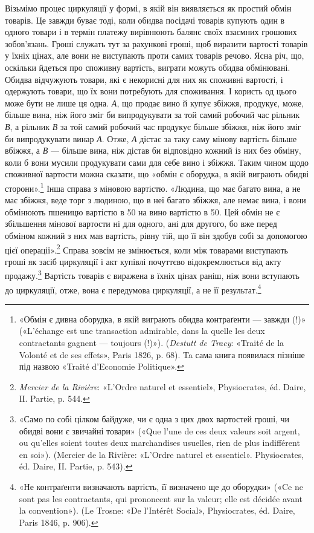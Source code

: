 Візьмімо процес циркуляції у формі, в якій він виявляється
як простий обмін товарів. Це завжди буває тоді, коли обидва
посідачі товарів купують один в одного товари і в термін платежу
вирівнюють балянс своїх взаємних грошових зобов’язань. Гроші
служать тут за рахункові гроші, щоб виразити вартості товарів
у їхніх цінах, але вони не виступають проти самих товарів речово.
Ясна річ, що, оскільки йдеться про споживну вартість,
виграти можуть обидва обмінювані. Обидва відчужують товари,
які є некорисні для них як споживні вартості, і одержують товари,
що їх вони потребують для споживання. І користь од цього може
бути не лише ця одна. \emph{А}, що продає вино й купує збіжжя, продукує,
може, більше вина, ніж його зміг би випродукувати за той
самий робочий час рільник \emph{В}, а рільник \emph{В} за той самий робочий
час продукує більше збіжжя, ніж його зміг би випродукувати
винар \emph{А}. Отже, \emph{А} дістає за таку саму мінову вартість більше
вбіжжя, а \emph{В} — більше вина, ніж дістав би відповідно кожний
із них без обміну, коли б вони мусили продукувати сами для себе
вино і збіжжя. Таким чином щодо споживної вартости можна
сказати, що «обмін є оборудка, в якій виграють обидві сторони».\footnote{
«Обмін є дивна оборудка, в якій виграють обидва контраґенти —
завжди (!)» («L’échange est une transaction admirable, dans la quelle les
deux contractants gagnent — toujours (!)»). (\emph{Destutt de Tracy}: «Traité de
la Volonté et de ses effets», Paris 1826, p. 68). Ta сама книга появилася пізніше
під назвою «Traité d’Economie Politique».
}
Інша справа з міновою вартістю. «Людина, що має багато вина,
а не має збіжжя, веде торг з людиною, що в неї багато збіжжя,
але немає вина, і вони обмінюють пшеницю вартістю в 50 на
вино вартістю в 50. Цей обмін не є збільшення мінової вартости
ні для одного, ані для другого, бо вже перед обміном кожний
з них мав вартість, рівну тій, що її він здобув собі за допомогою
цієї операції».\footnote{
\emph{Mercier de la Rivière}: «L’Ordre naturel et essentiel», Physiocrates, éd.
Daire, IІ. Partie, p. 544.
} Справа зовсім не змінюється, коли між товарами
виступають гроші як засіб циркуляції і акт купівлі почуттєво
відокремлюється від акту продажу.\footnote{
«Само по собі цілком байдуже, чи є одна з цих двох вартостей
гроші, чи обидві вони є звичайні товари» («Que l’une de ces deux valeurs
soit argent, ou qu’elles soient toutes deux marchandises usuelles, rien de
plus indifférent en soi»). (Mercier de la Rivière: «L’Ordre naturel et essentiel».
Physiocrates, éd. Daire, II. Partie, p. 543).
} Вартість товарів є виражена
в їхніх цінах раніш, ніж вони вступають до циркуляції, отже,
вона є передумова циркуляції, а не її результат.\footnote{
«Не контраґенти визначають вартість, її визначено ще до оборудки»
(«Ce ne sont pas les contractants, qui prononcent sur la valeur; elle est
décidée avant la convention»). (Le Trosne: «De l’Intérêt Social», Physiocrates,
éd. Daire, Paris 1846, p. 906).
}

